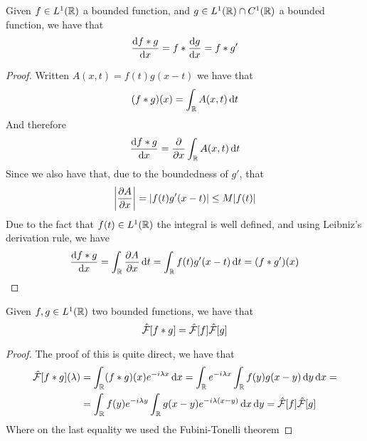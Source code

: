 \documentclass[../complete.tex]{subfiles}
\begin{document}
\begin{thm}
	Given $f\in L^1(\mathbb{R})$ a bounded function, and $g\in L^1(\mathbb{R})\cap C^1(\mathbb{R})$ a bounded function, we have that
	\begin{equation}
		\derivative{f*g}{x}=f*\derivative{g}{x}=f*g'
		\label{eq:convderiv}
	\end{equation}
\end{thm}
\begin{proof}
	Written $A(x,t)=f(t)g(x-t)$ we have that
	\begin{equation*}
		(f*g)(x)=\int_{\mathbb{R}}^{}A(x,t)\operatorname{d\!} t
	\end{equation*}
	And therefore
	\begin{equation*}
		\derivative{f*g}{x}=\pdv{x}\int_{\R}^{}A(x,t)\diff t
	\end{equation*}
	Since we also have that, due to the boundedness of $g'$, that
	\begin{equation*}
		\abs{\pdv{A}{x}}=\abs{f(t)g'(x-t)}\le M\abs{f(t)}
	\end{equation*}
	Due to the fact that $f(t)\in L^1(\mathbb{R})$ the integral is well defined, and using Leibniz's derivation rule, we have
	\begin{equation*}
		\derivative{f*g}{x}=\int_\R\pdv{A}{x}\diff t=\int_{\R}^{}f(t)g'(x-t)\diff t=(f*g')(x)
	\end{equation*}
\end{proof}
\begin{thm}
	Given $f,g\in L^1(\mathbb{R})$ two bounded functions, we have that
	\begin{equation}
		\hat{\mathcal{F}}[f*g]=\hat{\mathcal{F}}[f]\hat{\mathcal{F}}[g]
		\label{eq:convprodfou}
	\end{equation}
\end{thm}
\begin{proof}
	The proof of this is quite direct, we have that
	\begin{equation*}
		\begin{aligned}
			\hat{\mathcal{F}}[f*g](\lambda)&=\int_{\mathbb{R}}^{}(f*g)(x)e^{-i\lambda x}\operatorname{d\!} x=\int_{\mathbb{R}}^{}e^{-i\lambda x}\int_{\mathbb{R}}^{}f(y)g(x-y)\operatorname{d\!} y\operatorname{d\!} x=\\
			&=\int_{\mathbb{R}}^{}f(y)e^{-i\lambda y}\int_{\mathbb{R}}^{}g(x-y)e^{-i\lambda(x-y)}\operatorname{d\!} x\operatorname{d\!} y=\hat{\mathcal{F}}[f]\hat{\mathcal{F}}[g]
		\end{aligned}
	\end{equation*}
	Where on the last equality we used the Fubini-Tonelli theorem
\end{proof}
\end{document}
